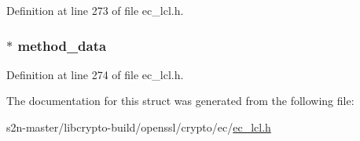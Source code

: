 Definition at line 273 of file ec\+\_\+lcl.\+h.

\subsubsection[{\texorpdfstring{method\+\_\+data}{method_data}}]{$\ast$ method\+\_\+data}\hypertarget{structec__key__st_a3d84541d7ee3ef09f086be646c6c85e1}{}\label{structec__key__st_a3d84541d7ee3ef09f086be646c6c85e1}


Definition at line 274 of file ec\+\_\+lcl.\+h.



The documentation for this struct was generated from the following file\+:\begin{DoxyCompactItemize}
\item 
s2n-\/master/libcrypto-\/build/openssl/crypto/ec/\hyperlink{ec__lcl_8h}{ec\+\_\+lcl.\+h}\end{DoxyCompactItemize}
